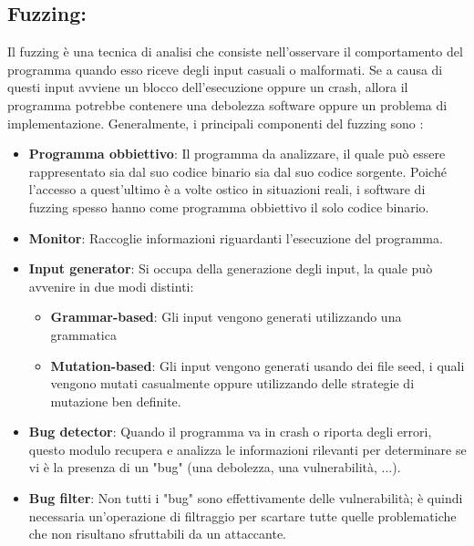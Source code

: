 \documentclass[../main.tex]{subfiles}
\begin{document}
\subsection{Fuzzing: }
Il fuzzing è una tecnica di analisi che consiste nell'osservare il comportamento del programma quando esso
riceve degli input casuali o malformati. Se a causa di questi input avviene un blocco dell'esecuzione oppure un crash, allora il programma
potrebbe contenere una debolezza software oppure un problema di implementazione. Generalmente, i principali componenti del fuzzing sono  \cite{Fuzzing_soa}:
\begin{itemize}
    \item \textbf{Programma obbiettivo}: Il programma da analizzare, il quale può essere rappresentato sia dal suo codice binario sia dal suo codice sorgente. Poiché l'accesso a quest'ultimo è a volte ostico in situazioni reali, i software di fuzzing spesso
    hanno come programma obbiettivo il solo codice binario.
    \item \textbf{Monitor}: Raccoglie informazioni riguardanti l'esecuzione del programma.
    \item \textbf{Input generator}: Si occupa della generazione degli input, la quale può avvenire in due modi distinti:
    \begin{itemize}
        \item \textbf{Grammar-based}: Gli input vengono generati utilizzando una grammatica 
        \item \textbf{Mutation-based}: Gli input vengono generati usando dei file seed, i quali vengono mutati casualmente oppure utilizzando
        delle strategie di mutazione ben definite.
    \end{itemize}
    \item \textbf{Bug detector}: Quando il programma va in crash o riporta degli errori, questo modulo recupera e analizza le informazioni rilevanti per determinare se vi è la presenza di un "bug" (una debolezza, una vulnerabilità, ...).
    \item \textbf{Bug filter}: Non tutti i "bug" sono effettivamente delle vulnerabilità; è quindi necessaria un'operazione di filtraggio per scartare tutte quelle problematiche che non risultano sfruttabili da un attaccante.
\end{itemize}
\end{document}
